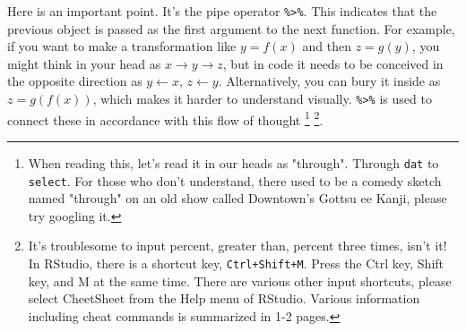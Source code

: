 \documentclass{ltjsbook}
\begin{document}
Here is an important point. It's the pipe operator \verb|%>%|. This indicates that the previous object is passed as the first argument to the next function. For example, if you want to make a transformation like $y=f(x)$ and then $z=g(y)$, you might think in your head as $x\to y \to z$, but in code it needs to be conceived in the opposite direction as $y \leftarrow x$, $z \leftarrow y$. Alternatively, you can bury it inside as $z=g(f(x))$, which makes it harder to understand visually. \verb|%>%| is used to connect these in accordance with this flow of thought \footnote{When reading this, let's read it in our heads as "through". Through \verb|dat| to \verb|select|. For those who don't understand, there used to be a comedy sketch named "through" on an old show called Downtown's Gottsu ee Kanji, please try googling it.} \footnote{It's troublesome to input percent, greater than, percent three times, isn’t it! In RStudio, there is a shortcut key, \verb|Ctrl+Shift+M|. Press the Ctrl key, Shift key, and M at the same time. There are various other input shortcuts, please select CheetSheet from the Help menu of RStudio. Various information including cheat commands is summarized in 1-2 pages.}.
\end{document}
